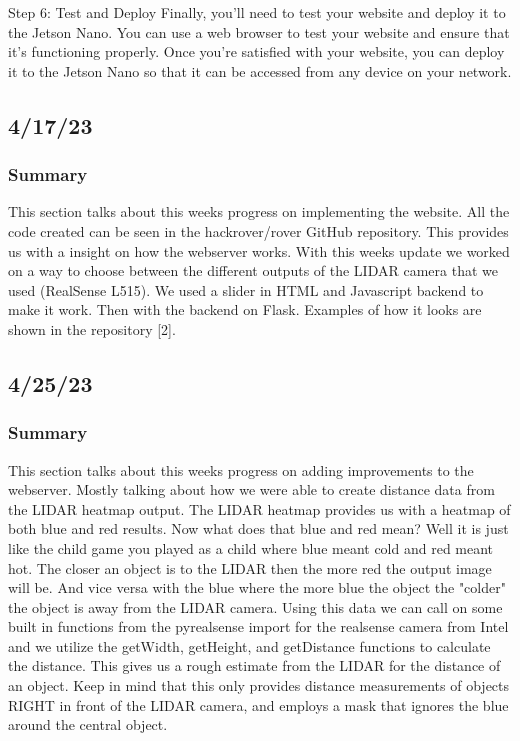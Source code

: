 \documentclass[a4paper, 10pt]{article}
\begin{document}
        Step 6: Test and Deploy
        Finally, you'll need to test your website and deploy it to the Jetson Nano. You can use a web browser to test your website and ensure that it's functioning properly. Once you're satisfied with your website, you can deploy it to the Jetson Nano so that it can be accessed from any device on your network.

    \subsection{4/17/23}
        \subsubsection{Summary}
        This section talks about this weeks progress on implementing the website. All the code created can be seen in the hackrover/rover GitHub repository. This provides us with a insight on how the webserver works. With this weeks update we worked on a way to choose between the different outputs of the LIDAR camera that we used (RealSense L515). We used a slider in HTML and Javascript backend to make it work. Then with the backend on Flask. Examples of how it looks are shown in the repository [2].

    \subsection{4/25/23}
        \subsubsection{Summary}
        This section talks about this weeks progress on adding improvements to the webserver. Mostly talking about how we were able to create distance data from the LIDAR heatmap output. The LIDAR heatmap provides us with a heatmap of both blue and red results.
        Now what does that blue and red mean? Well it is just like the child game you played as a child where blue meant cold and red meant hot. The closer an object is to the LIDAR then the more red the output image will be. And vice versa with the blue where the more blue the object the "colder" the object is away from the LIDAR camera. Using this data we can call on some built in functions from the pyrealsense import for the realsense camera from Intel and we utilize the getWidth, getHeight, and getDistance functions to calculate the distance. This gives us a rough estimate from the LIDAR for the distance of an object. Keep in mind that this only provides distance measurements of objects RIGHT in front of the LIDAR camera, and employs a mask that ignores the blue around the central object. 
\end{document}
